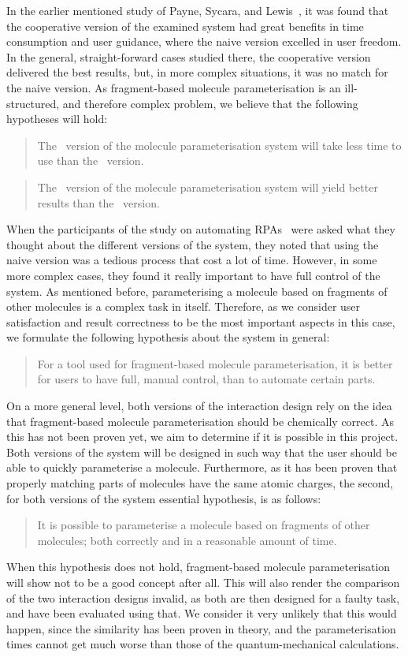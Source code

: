 In the earlier mentioned study of Payne, Sycara, and Lewis~\cite{payne2000varying}, it was found that the cooperative version of the examined system had great benefits in time consumption and user guidance, where the naive version excelled in user freedom. In the general, straight-forward cases studied there, the cooperative version delivered the best results, but, in more complex situations, it was no match for the naive version. As fragment-based molecule parameterisation is an ill-structured, and therefore complex problem, we believe that the following hypotheses will hold:
\begin{quote}
The \IDb\ version of the molecule parameterisation system will take less time to use than the \IDa\ version.
\end{quote}
\begin{quote}
The \IDa\ version of the molecule parameterisation system will yield better results than the \IDb\ version.
\end{quote}

When the participants of the study on automating RPAs~\cite{payne2000varying} were asked what they thought about the different versions of the system, they noted that using the naive version was a tedious process that cost a lot of time. However, in some more complex cases, they found it really important to have full control of the system. As mentioned before, parameterising a molecule based on fragments of other molecules is a complex task in itself. Therefore, as we consider user satisfaction and result correctness to be the most important aspects in this case, we formulate the following hypothesis about the system in general:
\begin{quote}
For a tool used for fragment-based molecule parameterisation, it is better for users to have full, manual control, than to automate certain parts.
\end{quote}

On a more general level, both versions of the interaction design rely on the idea that fragment-based molecule parameterisation should be chemically correct. As this has not been proven yet, we aim to determine if it is possible in this project. Both versions of the system will be designed in such way that the user should be able to quickly parameterise a molecule. Furthermore, as it has been proven that properly matching parts of molecules have the same atomic charges, the second, for both versions of the system essential hypothesis, is as follows:
\begin{quote}
It is possible to parameterise a molecule based on fragments of other molecules; both correctly and in a reasonable amount of time.
\end{quote}

When this hypothesis does not hold, fragment-based molecule parameterisation will show not to be a good concept after all. This will also render the comparison of the two interaction designs invalid, as both are then designed for a faulty task, and have been evaluated using that. We consider it very unlikely that this would happen, since the similarity has been proven in theory, and the parameterisation times cannot get much worse than those of the quantum-mechanical calculations.
